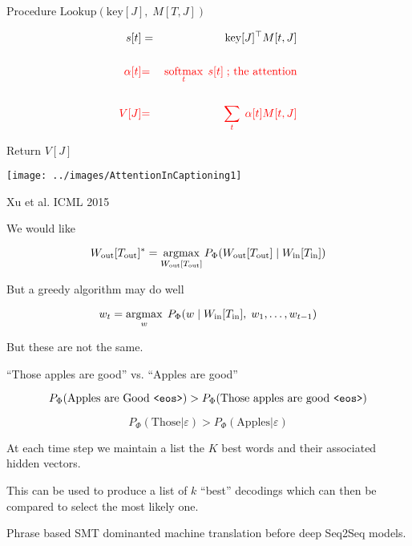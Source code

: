 {Procedure $\mathrm{Lookup}(\mathrm{key}[J],\;M[T,J])$

\bigskip
\begin{eqnarray*}
s[t] & = &\mathrm{key}[J]^\top M[t,J] \\
\\
{\color{red} \alpha[t]} & {\color{red} =} & {\color{red} \operatorname*{softmax}_t \;s[t]\;\mbox{; the attention}} \\
\\
{\color{red} V[J]} & {\color{red} =} & {\color{red} \sum_t\;\alpha[t]M[t,J]}
\end{eqnarray*}

\bigskip
Return $V[J]$




\centerline{\texttt{[image: ../images/AttentionInCaptioning1]}}
\centerline{Xu et al. ICML 2015}


We would like

\vfill
$$W_{\mathrm{out}}[T_{\mathrm{out}}]^* = \operatorname*{argmax}_{W_{\mathrm{out}}[T_{\mathrm{out}}]}
P_\Phi(W_{\mathrm{out}}[T_{\mathrm{out}}] \;|\;W_{\mathrm{in}}[T_{\mathrm{in}}])$$

\vfill
But a greedy algorithm may do well

\vfill
$$w_t = \operatorname*{argmax}_w\; P_\Phi(w\;|\;W_{\mathrm{in}}[T_{\mathrm{in}}],\;w_1,\ldots,w_{t-1})$$

\vfill
But these are not the same.


``Those apples are good'' vs. ``Apples are good''

\vfill
$$P_\Phi(\mbox{Apples are Good {\tt <eos>}}) > P_\Phi(\mbox{Those apples are good {\tt <eos>}})$$

\vfill
$$P_\Phi(\mbox{Those}|\varepsilon) > P_\Phi(\mbox{Apples}|\varepsilon)$$
    

At each time step we maintain a list the $K$ best words and their associated hidden vectors.

\vfill
This can be used to produce a list of $k$ ``best'' decodings which can then be compared to select
the most likely one.



Phrase based SMT dominanted machine translation before deep Seq2Seq models.

}
